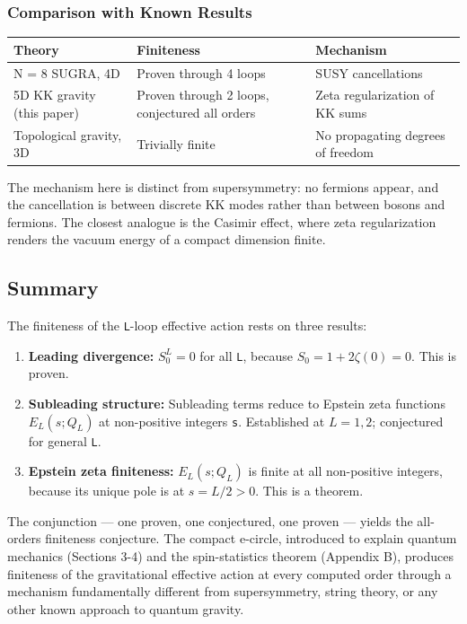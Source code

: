 \documentclass[aps,prd,preprint,superscriptaddress,longbibliography,floatfix]{revtex4-2}
\theoremstyle{remark}
\begin{document}
\subsubsection{Comparison with Known Results}


\begin{table}[H]
\begin{ruledtabular}
\begin{tabular}{p{5.0cm}p{5.0cm}p{5.0cm}}
Theory & Finiteness & Mechanism \\
\hline
N = 8 SUGRA, 4D & Proven through 4 loops & SUSY cancellations \\
5D KK gravity (this paper) & Proven through 2 loops, conjectured all orders & Zeta regularization of KK sums \\
Topological gravity, 3D & Trivially finite & No propagating degrees of freedom \\
\end{tabular}
\end{ruledtabular}
\end{table}

The mechanism here is distinct from supersymmetry: no fermions appear, and the cancellation is between discrete KK modes rather than between bosons and fermions. The closest analogue is the Casimir effect, where zeta regularization renders the vacuum energy of a compact dimension finite.



\subsection{Summary}

The finiteness of the \texttt{L}-loop effective action rests on three results:


\begin{enumerate}
  \item \textbf{Leading divergence:} $S_{0}^L = 0$ for all \texttt{L}, because $S_{0} = 1 + 2\zeta(0) = 0$. This is proven.
  \item \textbf{Subleading structure:} Subleading terms reduce to Epstein zeta functions $E_L(s; Q_L)$ at non-positive integers \texttt{s}. Established at $L = 1, 2$; conjectured for general \texttt{L}.
  \item \textbf{Epstein zeta finiteness:} $E_L(s; Q_L)$ is finite at all non-positive integers, because its unique pole is at $s = L/2 > 0$. This is a theorem.
\end{enumerate}

The conjunction --- one proven, one conjectured, one proven --- yields the all-orders finiteness conjecture. The compact e-circle, introduced to explain quantum mechanics (Sections 3-4) and the spin-statistics theorem (Appendix B), produces finiteness of the gravitational effective action at every computed order through a mechanism fundamentally different from supersymmetry, string theory, or any other known approach to quantum gravity.
\end{document}
